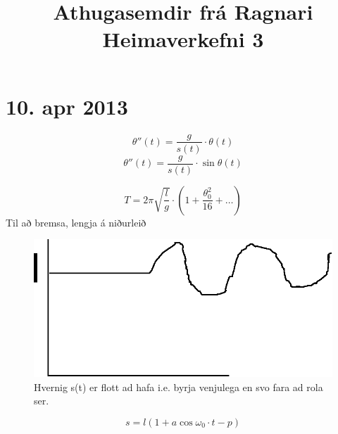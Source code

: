 \documentclass[a4]{article}
\title{Athugasemdir frá Ragnari\\ Heimaverkefni 3}
\begin{document}
\maketitle
\section{10. apr 2013}

$$\theta''(t) = \frac{g}{s(t)} \cdot \theta(t)$$
$$\theta''(t) = \frac{g}{s(t)} \cdot \sin{\theta(t)}$$

$$T = 2\pi \sqrt{\frac{l}{g}} \cdot \left( 1 + \frac{\theta_0^2}{16} + \ldots \right)$$
Til að bremsa, lengja á niðurleið
\begin{figure}
  \caption{Hvernig s(t) er flott ad hafa i.e. byrja venjulega en svo fara ad rola ser.}
  \centerline{\includegraphics[scale=0.5]{timaath.eps}}
\end{figure}

$$ s = l(1 +a \cos{\omega_0 \cdot t - p})$$
\end{document}
